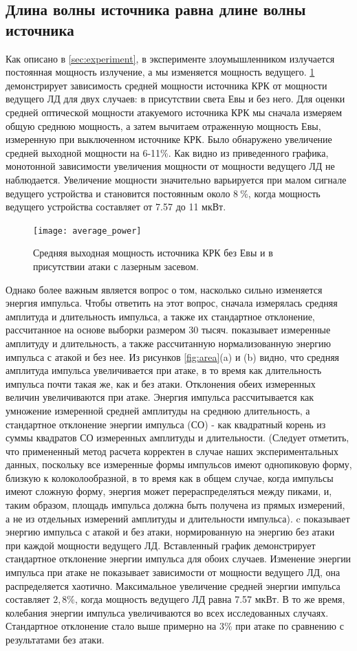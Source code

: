 \subsection{Длина волны источника равна длине волны источника}

Как описано в \cref{sec:experiment}, в эксперименте злоумышленником излучается постоянная мощность излучение, а мы изменяется мощность ведущего. \ref{fig:average_power} демонстрирует зависимость средней мощности источника КРК от мощности ведущего ЛД для двух случаев: в присутствии света Евы и без него. Для оценки средней оптической мощности атакуемого источника КРК мы сначала измеряем общую среднюю мощность, а затем вычитаем отраженную мощность Евы, измеренную при выключенном источнике КРК. Было обнаружено увеличение средней выходной мощности на 6-11\%. Как видно из приведенного графика, монотонной зависимости увеличения мощности от мощности ведущего ЛД не наблюдается. Увеличение мощности значительно варьируется при малом сигнале ведущего устройства и становится постоянным около $8~\%$, когда мощность ведущего устройства составляет от 7.57 до 11 мкВт.
\begin{figure}
\texttt{[image: average\_power]}
\caption{Средняя выходная мощность источника КРК без Евы и в присутствии атаки с лазерным засевом.}
\label{fig:average_power}
\end{figure}
Однако более важным является вопрос о том, насколько сильно изменяется энергия импульса. Чтобы ответить на этот вопрос, сначала измерялась средняя амплитуда и длительность импульса, а также их стандартное отклонение, рассчитанное на основе выборки размером 30 тысяч.  показывает измеренные амплитуду и длительность, а также рассчитанную нормализованную энергию импульса с атакой и без нее. Из рисунков \ref{fig:area}(a) и (b) видно, что средняя амплитуда импульса увеличивается при атаке, в то время как длительность импульса почти такая же, как и без атаки. Отклонения обеих измеренных величин увеличиваются при атаке. Энергия импульса рассчитывается как умножение измеренной средней амплитуды на среднюю длительность, а стандартное отклонение энергии импульса (СО) - как квадратный корень из суммы квадратов СО измеренных амплитуды и длительности. (Следует отметить, что примененный метод расчета корректен в случае наших экспериментальных данных, поскольку все измеренные формы импульсов имеют однопиковую форму, близкую к колоколообразной, в то время как в общем случае, когда импульсы имеют сложную форму, энергия может перераспределяться между пиками, и, таким образом, площадь импульса должна быть получена из прямых измерений, а не из отдельных измерений амплитуды и длительности импульса). c показывает энергию импульса с атакой и без атаки, нормированную на энергию без атаки при каждой мощности ведущего ЛД. Вставленный график демонстрирует стандартное отклонение энергии импульса для обоих случаев. Изменение энергии импульса при атаке не показывает зависимости от мощности ведущего ЛД, она распределяется хаотично. Максимальное увеличение средней энергии импульса составляет $2,8\%$, когда мощность ведущего ЛД равна 7.57 мкВт. В то же время, колебания энергии импульса увеличиваются во всех исследованных случаях. Стандартное отклонение стало выше примерно на 3\% при атаке по сравнению с результатами без атаки.

